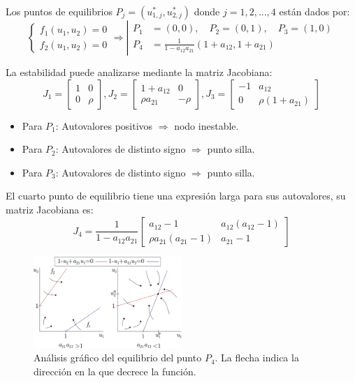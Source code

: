 \documentclass[twocolumn,aps,prl]{revtex4-1}
\begin{document}
Los puntos de equilibrios $P_j = (u^*_{1,j},u^*_{2,j})$ donde $j= 1, 2, ..., 4$ están dados por: 
$$
\left\{
\begin{aligned}
    f_1(u_1, u_2) = 0\\ 
    f_2(u_1, u_2) = 0
\end{aligned} \right. \Rightarrow
\left\lvert 
\begin{aligned}
    P_1 &= (0, 0), \quad P_2 = (0, 1), \quad P_3 = (1, 0) \\ 
    P_4 &= \frac{1}{1-a_{12} a_{21}}(1+a_{12}, 1+a_{21})
\end{aligned} \right.
$$

La estabilidad puede analizarse mediante la matriz Jacobiana:
$$
J_1 = \begin{bmatrix}
    1 & 0 \\
    0 & \rho 
\end{bmatrix}
,
J_2 = \begin{bmatrix}
    1 + a_{12} & 0 \\
     \rho a_{21} & - \rho 
\end{bmatrix}
,
J_3 = \begin{bmatrix}
    -1 & a_{12} \\
    0      & \rho \left( 1 + a_{21} \right)
\end{bmatrix}
$$
\begin{itemize}
    \item Para $P_1$: Autovalores positivos $\Rightarrow$ nodo inestable.
    \item Para $P_2$: Autovalores de distinto signo $\Rightarrow$ punto silla.
    \item Para $P_3$: Autovalores de distinto signo $\Rightarrow$ punto silla.
\end{itemize}

El cuarto punto de equilibrio tiene una expresión larga para sus autovalores, su matriz Jacobiana es:
$$
J_4 = 
\frac{1}{1-a_{12} a_{21}}
\begin{bmatrix}
    a_{12} - 1 & a_{12} (a_{12} - 1) \\
    \rho a_{21} (a_{21} - 1) & a_{21} - 1
\end{bmatrix}
$$


\begin{figure}
    \centering
    \includegraphics[width=0.5\textwidth]{figuras/equilibrio.pdf}
    \caption{Análisis gráfico del equilibrio del punto $P_4$. La flecha indica la dirección en la que decrece la función.}
    \label{fig:mosquitos}
\end{figure}
\end{document}
